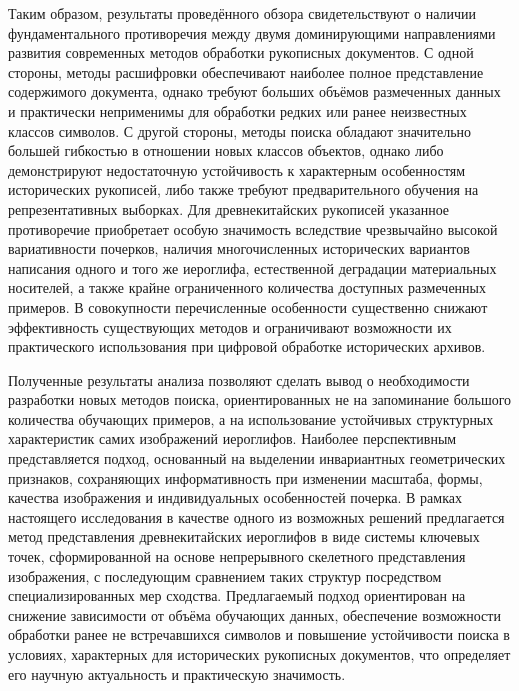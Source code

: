 Таким образом, результаты проведённого обзора свидетельствуют о наличии фундаментального противоречия между двумя доминирующими направлениями развития современных методов обработки рукописных документов. С одной стороны, методы расшифровки обеспечивают наиболее полное представление содержимого документа, однако требуют больших объёмов размеченных данных и практически неприменимы для обработки редких или ранее неизвестных классов символов. С другой стороны, методы поиска обладают значительно большей гибкостью в отношении новых классов объектов, однако либо демонстрируют недостаточную устойчивость к характерным особенностям исторических рукописей, либо также требуют предварительного обучения на репрезентативных выборках. Для древнекитайских рукописей указанное противоречие приобретает особую значимость вследствие чрезвычайно высокой вариативности почерков, наличия многочисленных исторических вариантов написания одного и того же иероглифа, естественной деградации материальных носителей, а также крайне ограниченного количества доступных размеченных примеров. В совокупности перечисленные особенности существенно снижают эффективность существующих методов и ограничивают возможности их практического использования при цифровой обработке исторических архивов.

Полученные результаты анализа позволяют сделать вывод о необходимости разработки новых методов поиска, ориентированных не на запоминание большого количества обучающих примеров, а на использование устойчивых структурных характеристик самих изображений иероглифов. Наиболее перспективным представляется подход, основанный на выделении инвариантных геометрических признаков, сохраняющих информативность при изменении масштаба, формы, качества изображения и индивидуальных особенностей почерка. В рамках настоящего исследования в качестве одного из возможных решений предлагается метод представления древнекитайских иероглифов в виде системы ключевых точек, сформированной на основе непрерывного скелетного представления изображения, с последующим сравнением таких структур посредством специализированных мер сходства. Предлагаемый подход ориентирован на снижение зависимости от объёма обучающих данных, обеспечение возможности обработки ранее не встречавшихся символов и повышение устойчивости поиска в условиях, характерных для исторических рукописных документов, что определяет его научную актуальность и практическую значимость.


\FloatBarrier
